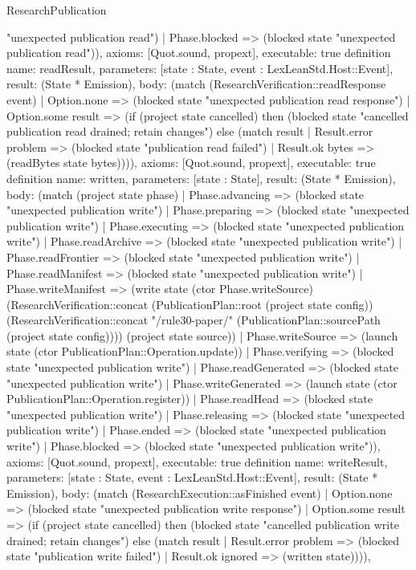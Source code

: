 \begin{lexlean}{ResearchPublication}
\begin{semanticmodule}
{"unexpected publication read") | Phase.blocked => (blocked state "unexpected publication read")),
 axioms: [Quot.sound, propext],
 executable: true
}
definition{
 name: readResult,
 parameters: [state : State, event : LexLeanStd.Host::Event],
 result: (State * Emission),
 body: (match (ResearchVerification::readResponse event) | Option.none => (blocked state "unexpected publication read response") | Option.some result => (if (project state cancelled) then (blocked state "cancelled publication read drained; retain changes") else (match result | Result.error problem => (blocked state "publication read failed") | Result.ok bytes => (readBytes state bytes)))),
 axioms: [Quot.sound, propext],
 executable: true
}
definition{
 name: written,
 parameters: [state : State],
 result: (State * Emission),
 body: (match (project state phase) | Phase.advancing => (blocked state "unexpected publication write") | Phase.preparing => (blocked state "unexpected publication write") | Phase.executing => (blocked state "unexpected publication write") | Phase.readArchive => (blocked state "unexpected publication write") | Phase.readFrontier => (blocked state "unexpected publication write") | Phase.readManifest => (blocked state "unexpected publication write") | Phase.writeManifest => (write state (ctor Phase.writeSource) (ResearchVerification::concat (PublicationPlan::root (project state config)) (ResearchVerification::concat "/rule30-paper/" (PublicationPlan::sourcePath (project state config)))) (project state source)) | Phase.writeSource => (launch state (ctor PublicationPlan::Operation.update)) | Phase.verifying => (blocked state "unexpected publication write") | Phase.readGenerated => (blocked state "unexpected publication write") | Phase.writeGenerated => (launch state (ctor PublicationPlan::Operation.register)) | Phase.readHead => (blocked state "unexpected publication write") | Phase.releasing => (blocked state "unexpected publication write") | Phase.ended => (blocked state "unexpected publication write") | Phase.blocked => (blocked state "unexpected publication write")),
 axioms: [Quot.sound, propext],
 executable: true
}
definition{
 name: writeResult,
 parameters: [state : State, event : LexLeanStd.Host::Event],
 result: (State * Emission),
 body: (match (ResearchExecution::asFinished event) | Option.none => (blocked state "unexpected publication write response") | Option.some result => (if (project state cancelled) then (blocked state "cancelled publication write drained; retain changes") else (match result | Result.error problem => (blocked state "publication write failed") | Result.ok ignored => (written state)))),
}
\end{semanticmodule}
\end{lexlean}
